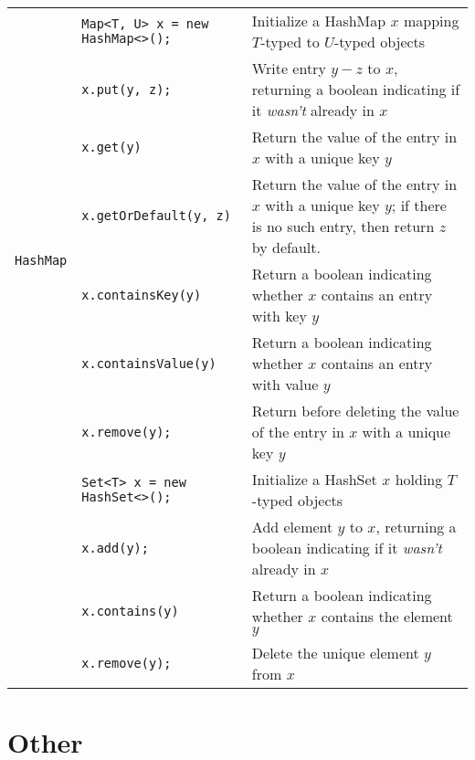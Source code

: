 \documentclass{article}
\begin{document}
\begin{center}
\begin{tabularx}{\textwidth}{llX}
\multirow{8}{*}[-0.5em]{\lstinline|HashMap|} & \lstinline|Map<T, U> x = new HashMap<>();| & Initialize a HashMap \(x\) mapping \(T\)-typed to \(U\)-typed objects\\
& \lstinline|x.put(y, z);| & Write entry \(y-z\) to \(x\), returning a boolean indicating if it \textit{wasn't} already in \(x\)\\
& \lstinline|x.get(y)| & Return the value of the entry in \(x\) with a unique key \(y\)\\
& \lstinline|x.getOrDefault(y, z)| & Return the value of the entry in \(x\) with a unique key \(y\); if there is no such entry, then return \(z\) by default.\\
& \lstinline|x.containsKey(y)| & Return a boolean indicating whether \(x\) contains an entry with key \(y\)\\
& \lstinline|x.containsValue(y)| & Return a boolean indicating whether \(x\) contains an entry with value \(y\)\\
& \lstinline|x.remove(y);| & Return before deleting the value of the entry in \(x\) with a unique key \(y\)\\\midrule

\multirow{4}{*}[-0.5em]{\lstinline|HashSet|} & \lstinline|Set<T> x = new HashSet<>();| & Initialize a HashSet \(x\) holding \(T\)-typed objects\\
& \lstinline|x.add(y);| & Add element \(y\) to \(x\), returning a boolean indicating if it \textit{wasn't} already in \(x\)\\
& \lstinline|x.contains(y)| & Return a boolean indicating whether \(x\) contains the element \(y\)\\
& \lstinline|x.remove(y);| & Delete the unique element \(y\) from \(x\)\\

\bottomrule\end{tabularx}\end{center}

\section{Other}
\end{document}
